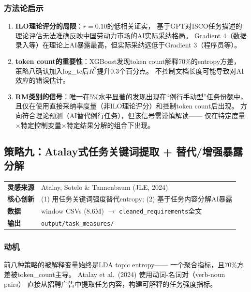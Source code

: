 \documentclass[12pt,a4paper]{ctexart}
\begin{document}
\subsubsection{方法论启示}

\begin{enumerate}
\item \textbf{ILO理论评分的局限}：$r=0.10$的低相关证实，
      基于GPT对ISCO任务描述的理论评估无法准确反映中国劳动力市场的AI实际采纳格局。
      Gradient 4（数据录入等）在理论上AI暴露最高，但实际采纳远低于Gradient 3（程序员等）。
\item \textbf{token count的重要性}：XGBoost发现token count解释70\%的entropy方差，
      策略八确认加入log\_tc后$R^2$提升0.3个百分点。
      不控制文档长度可能导致对AI效应的错误估计。
\item \textbf{RM类别的信号}：唯一在5\%水平显著的发现出现在``例行手动型''任务份额中，
      且仅在使用直接采纳率度量（非ILO理论评分）和控制token count后出现。
      方向符合理论预测（AI替代例行任务），但该信号需谨慎解读——
      仅在特定度量$\times$特定控制变量$\times$特定结果分解的组合下出现。
\end{enumerate}


\subsection{策略九：Atalay式任务关键词提取 + 替代/增强暴露分解}
\label{subsec:task_measures}

\begin{center}
\begin{tabular}{ll}
\textbf{灵感来源} & Atalay, Sotelo \& Tannenbaum (JLE, 2024) \\
\textbf{核心创新} & (1) 用任务关键词强度替代entropy; (2) 基于任务内容分解AI暴露 \\
\textbf{数据} & window CSVs (8.6M) $\to$ \texttt{cleaned\_requirements}全文 \\
\textbf{输出} & \texttt{output/task\_measures/}
\end{tabular}
\end{center}

\subsubsection{动机}

前八种策略的被解释变量始终是LDA topic entropy——
一个聚合指标，且70\%方差被token\_count主导。
Atalay et al.\ (2024) 使用动词-名词对（verb-noun pairs）
直接从招聘广告中提取任务内容，构建可解释的任务强度指标。
\end{document}
